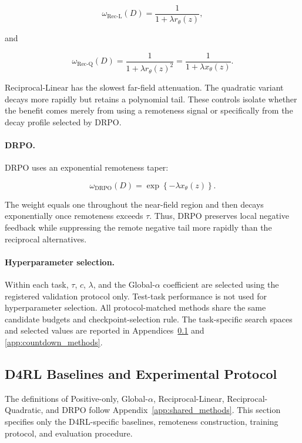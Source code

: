 \documentclass[sigconf,anonymous,review]{acmart}
\theoremstyle{acmdefinition}
\begin{document}
\[
\omega_{\mathrm{Rec\text{-}L}}(D)
=
\frac{1}{1+\lambda r_\theta(z)},
\]

and

\[
\omega_{\mathrm{Rec\text{-}Q}}(D)
=
\frac{1}{1+\lambda r_\theta(z)^2}
=
\frac{1}{1+\lambda x_\theta(z)}.
\]

Reciprocal-Linear has the slowest far-field attenuation. The quadratic
variant decays more rapidly but retains a polynomial tail. These
controls isolate whether the benefit comes merely from using a
remoteness signal or specifically from the decay profile selected by
DRPO.

\paragraph{DRPO.}

DRPO uses an exponential remoteness taper:

\[
\omega_{\mathrm{DRPO}}(D)
=
\exp\left\{
-\lambda x_\theta(z)
\right\}.
\]

The weight equals one throughout the near-field region and then decays
exponentially once remoteness exceeds \(\tau\). Thus, DRPO preserves
local negative feedback while suppressing the remote negative tail more
rapidly than the reciprocal alternatives.

\paragraph{Hyperparameter selection.}

Within each task, \(\tau\), \(c\), \(\lambda\), and the
Global-\(\alpha\) coefficient are selected using the registered
validation protocol only. Test-task performance is not used for
hyperparameter selection. All protocol-matched methods share the same
candidate budgets and checkpoint-selection rule. The task-specific
search spaces and selected values are reported in
Appendices~\ref{app:d4rl_methods} and
\ref{app:countdown_methods}.


\subsection{D4RL Baselines and Experimental Protocol}
\label{app:d4rl_methods}

The definitions of Positive-only, Global-\(\alpha\),
Reciprocal-Linear, Reciprocal-Quadratic, and DRPO follow
Appendix~\ref{app:shared_methods}. This section specifies only the
D4RL-specific baselines, remoteness construction, training protocol,
and evaluation procedure.
\end{document}
